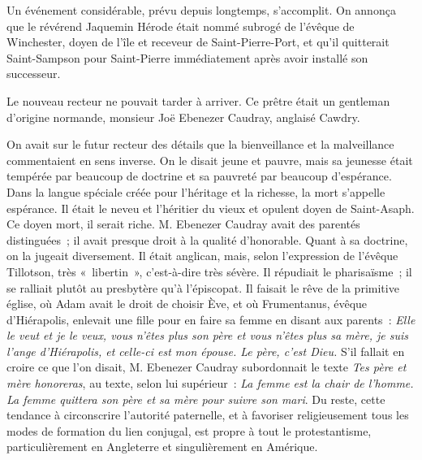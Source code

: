 \documentclass[french,twoside]{book} %
\begin{document}
Un événement considérable, prévu depuis longtemps, s’accomplit. On annonça que le révérend Jaquemin Hérode était nommé subrogé de l’évêque de Winchester, doyen de l’île et receveur de Saint-Pierre-Port, et qu’il quitterait Saint-Sampson pour Saint-Pierre immédiatement après avoir installé son successeur.\par
Le nouveau recteur ne pouvait tarder à arriver. Ce prêtre était un gentleman d’origine normande, monsieur Joë Ebenezer Caudray, anglaisé Cawdry.\par
On avait sur le futur recteur des détails que la bienveillance et la malveillance commentaient en sens  inverse. On le disait jeune et pauvre, mais sa jeunesse était tempérée par beaucoup de doctrine et sa pauvreté par beaucoup d’espérance. Dans la langue spéciale créée pour l’héritage et la richesse, la mort s’appelle espérance. Il était le neveu et l’héritier du vieux et opulent doyen de Saint-Asaph. Ce doyen mort, il serait riche. M. Ebenezer Caudray avait des parentés distinguées ; il avait presque droit à la qualité d’honorable. Quant à sa doctrine, on la jugeait diversement. Il était anglican, mais, selon l’expression de l’évêque Tillotson, très « libertin », c’est-à-dire très sévère. Il répudiait le pharisaïsme ; il se ralliait plutôt au presbytère qu’à l’épiscopat. Il faisait le rêve de la primitive église, où Adam avait le droit de choisir Ève, et où Frumentanus, évêque d’Hiérapolis, enlevait une fille pour en faire sa femme en disant aux parents : \emph{Elle le veut et je le veux, vous n’êtes plus son père et vous n’êtes plus sa mère, je suis l’ange d’Hiérapolis, et celle-ci est mon épouse. Le père, c’est Dieu.} S’il fallait en croire ce que l’on disait, M. Ebenezer Caudray subordonnait le texte \emph{Tes père et mère honoreras}, au texte, selon lui supérieur : \emph{La femme est la chair de l’homme. La femme quittera son père et sa mère pour suivre son mari}. Du reste, cette tendance à circonscrire l’autorité paternelle, et à favoriser religieusement tous les modes de formation du lien conjugal, est propre à tout le protestantisme, particulièrement en Angleterre et singulièrement en Amérique.
\end{document}
